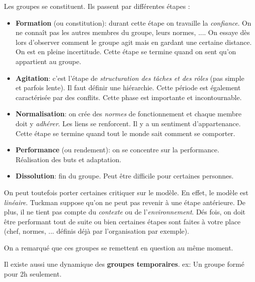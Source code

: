 \documentclass[12pt]{article}
\begin{document}
		Les groupes se constituent. Ils passent par différentes étapes : \newline
		\begin{itemize}
		\item \textbf{Formation} (ou constitution): durant cette étape on travaille la \textit{confiance}. On ne connaît pas les autres membres du groupe, leurs normes, .... On essaye dès lors d'observer comment le groupe agit mais en gardant une certaine distance. On est en pleine incertitude. Cette étape se termine quand on sent qu'on appartient au groupe.
		\item \textbf{Agitation}: c'est l'étape de \textit{structuration des tâches et des rôles} (pas simple et parfois lente). Il faut définir une hiérarchie. Cette période est également caractérisée par des conflits. Cette phase est importante et incontournable.
		\item \textbf{Normalisation}: on crée des \textit{normes} de fonctionnement et chaque membre doit y \textit{adhérer}. Les liens se renforcent. Il y a un sentiment d'appartenance. Cette étape se termine quand tout le monde sait comment se comporter.
		\item \textbf{Performance} (ou rendement): on se concentre sur la performance. Réalisation des buts et adaptation.
		\item \textbf{Dissolution}: fin du groupe. Peut être difficile pour certaines personnes. \newline
		\end{itemize}
		
		On peut toutefois porter certaines critiquer sur le modèle. En effet, le modèle est \textit{linéaire}. Tuckman suppose qu'on ne peut pas revenir à une étape antérieure. De plus, il ne tient pas compte du \textit{contexte} ou de l'\textit{environnement}. Dés fois, on doit être performant tout de suite ou bien certaines étapes sont faites à votre place (chef, normes, ... définis déjà par l'organisation par exemple). \newline
		
		On a remarqué que ces groupes se remettent en question au même moment.\newline
		
		Il existe aussi une dynamique des \textbf{groupes temporaires}.\newline
		ex: Un groupe formé pour 2h seulement. \newline
		
\end{document}
